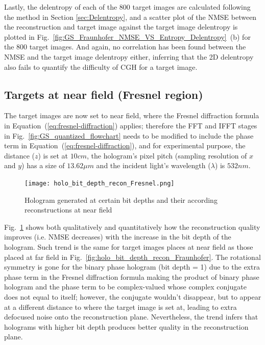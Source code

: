 	Lastly, the delentropy of each of the 800 target images are calculated following the method in Section \ref{sec:Delentropy}, and a scatter plot of the NMSE between the reconstruction and target image against the target image delentropy is plotted in Fig.~\ref{fig:GS_Fraunhofer_NMSE_VS_Entropy_Delentropy}~(b) for the 800 target images. And again, no correlation has been found between the NMSE and the target image delentropy either, inferring that the 2D delentropy also fails to quantify the difficulty of CGH for a target image.


\subsection{Targets at near field (Fresnel region)}
	The target images are now set to near field, where the Fresnel diffraction formula in Equation~(\ref{eq:fresnel-diffraction}) applies; therefore the FFT and IFFT stages in Fig.~\ref{fig:GS_quantized_flowchart} needs to be modified to include the phase term in Equation~(\ref{eq:fresnel-diffraction}), and for experimental purpose, the distance ($z$) is set at $10cm$, the hologram's pixel pitch (sampling resolution of $x$ and $y$) has a size of $13.62\mu m$ and the incident light's wavelength ($\lambda$) is $532nm$.
	\begin{figure} [ht]
	   \begin{center}
	   \texttt{[image: holo\_bit\_depth\_recon\_Fresnel.png]}
	   \end{center}
	   \caption{\label{fig:holo_bit_depth_recon_Fresnel} Hologram generated at certain bit depths and their according reconstructions at near field}
	\end{figure}

	Fig.~\ref{fig:holo_bit_depth_recon_Fresnel} shows both qualitatively and quantitatively how the reconstruction quality improves (i.e. NMSE decreases) with the increase in the bit depth of the hologram. Such trend is the same for target images places at near field as those placed at far field in Fig.~\ref{fig:holo_bit_depth_recon_Fraunhofer}. The rotational symmetry is gone for the binary phase hologram (bit depth = 1) due to the extra phase term in the Fresnel diffraction formula making the product of binary phase hologram and the phase term to be complex-valued whose complex conjugate does not equal to itself; however, the conjugate wouldn't disappear, but to appear at a different distance to where the target image is set at, leading to extra defocused noise onto the reconstruction plane. Nevertheless, the trend infers that holograms with higher bit depth produces better quality in the reconstruction plane.

